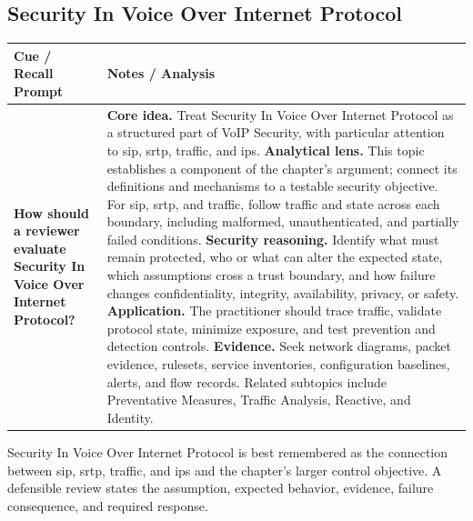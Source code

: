 \documentclass[11pt]{article}
\newcommand{\CornellHeader}{%
\rowcolor{Navy}\color{white}\bfseries Cue / Recall Prompt & \color{white}\bfseries Notes / Analysis\\\hline}
\newcommand{\CornellRow}[2]{%
\cellcolor{CueGray}\RaggedRight\textbf{#1} & \RaggedRight #2\\\hline}
\begin{document}
\subsection*{Security In Voice Over Internet Protocol}
\begin{longtable}{>{\RaggedRight\arraybackslash}p{}|>{\RaggedRight\arraybackslash}p{}}
\CornellHeader
\CornellRow{How should a reviewer evaluate Security In Voice Over Internet Protocol?}{\textbf{Core idea.} Treat Security In Voice Over Internet Protocol as a structured part of VoIP Security, with particular attention to sip, srtp, traffic, and ips. \textbf{Analytical lens.} This topic establishes a component of the chapter's argument; connect its definitions and mechanisms to a testable security objective. For sip, srtp, and traffic, follow traffic and state across each boundary, including malformed, unauthenticated, and partially failed conditions. \textbf{Security reasoning.} Identify what must remain protected, who or what can alter the expected state, which assumptions cross a trust boundary, and how failure changes confidentiality, integrity, availability, privacy, or safety. \textbf{Application.} The practitioner should trace traffic, validate protocol state, minimize exposure, and test prevention and detection controls. \textbf{Evidence.} Seek network diagrams, packet evidence, rulesets, service inventories, configuration baselines, alerts, and flow records. Related subtopics include Preventative Measures, Traffic Analysis, Reactive, and Identity.}
\end{longtable}
\begin{topicsummary}
Security In Voice Over Internet Protocol is best remembered as the connection between sip, srtp, traffic, and ips and the chapter's larger control objective. A defensible review states the assumption, expected behavior, evidence, failure consequence, and required response.
\end{topicsummary}
\end{document}
